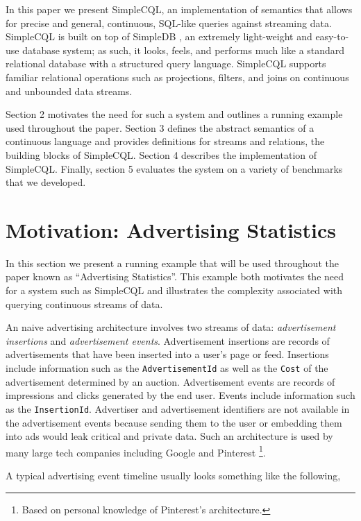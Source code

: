 \documentclass[a4paper, 10pt, conference]{IEEEconf}
\begin{document}
In this paper we present SimpleCQL, an implementation of semantics that allows for precise and general, continuous, SQL-like queries against streaming data.  SimpleCQL is built on top of SimpleDB \cite{simpledb}, an extremely light-weight and easy-to-use database system; as such, it looks, feels, and performs much like a standard relational database with a structured query language. SimpleCQL supports  familiar relational operations such as projections, filters, and joins on continuous and unbounded data streams.

Section 2 motivates the need for such a system and outlines a running example used throughout the paper.  Section 3 defines the abstract semantics of a continuous language and provides definitions for streams and relations, the building blocks of SimpleCQL.  Section 4 describes the implementation of SimpleCQL.  Finally, section 5 evaluates the system on a variety of benchmarks that we developed.


\section{Motivation: Advertising Statistics}
In this section we present a running example that will be used throughout the paper known as ``Advertising Statistics''.  This example both motivates the need for a system such as SimpleCQL and illustrates the complexity associated with querying continuous streams of data.

An naive advertising architecture involves two streams of data: \textit{advertisement insertions} and \textit{advertisement events}. Advertisement insertions are records of advertisements that have been inserted into a user's page or feed.  Insertions include information such as the \texttt{AdvertisementId} as well as the \texttt{Cost} of the advertisement determined by an auction.  Advertisement events are records of impressions and clicks generated by the end user.  Events include information such as the \texttt{InsertionId}.  Advertiser and advertisement identifiers are not available in the advertisement events because sending them to the user or embedding them into ads would leak critical and private data. Such an architecture is used by many large tech companies including Google \cite{photon} and Pinterest \footnote{Based on personal knowledge of Pinterest's architecture.}. 


A typical advertising event timeline usually looks something like the following,
\end{document}
